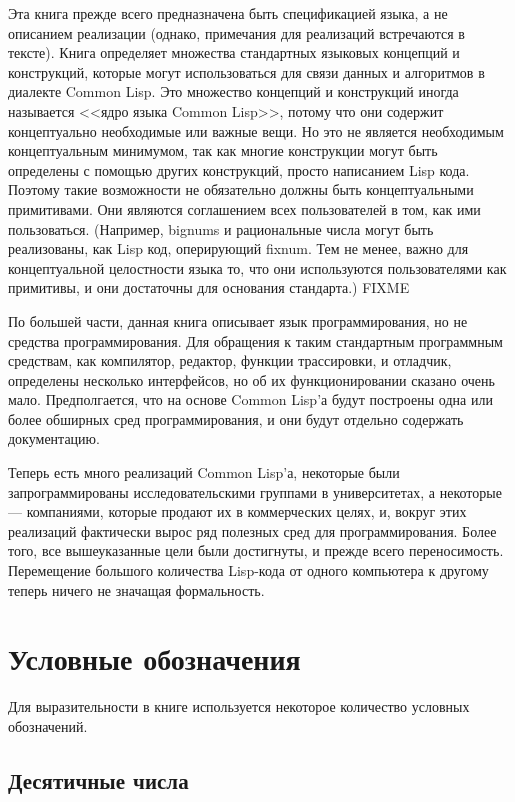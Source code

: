 Эта книга прежде всего предназначена быть спецификацией языка, а не
описанием реализации (однако, примечания для реализаций встречаются в тексте).
Книга определяет множества стандартных языковых концепций и конструкций, которые
могут использоваться для связи данных и алгоритмов в диалекте Common Lisp. Это
множество концепций и конструкций иногда называется <<ядро языка Common
Lisp>>, потому что они содержит концептуально необходимые или важные вещи. Но
это не является необходимым концептуальным минимумом, так как многие конструкции
могут быть определены с помощью других конструкций, просто написанием Lisp
кода. Поэтому такие возможности не обязательно должны быть 
концептуальными примитивами. Они являются соглашением всех пользователей в том,
как ими пользоваться. (Например, bignums и рациональные числа могут быть
реализованы, как Lisp код, оперирующий fixnum. Тем не менее, важно для
концептуальной целостности языка то, что они используются пользователями как
примитивы, и они достаточны для основания стандарта.) FIXME

По большей части, данная книга описывает язык программирования, но не средства
программирования. Для обращения к таким
стандартным программным средствам, как компилятор, редактор, функции
трассировки, и отладчик, определены несколько интерфейсов, но об их
функционировании сказано очень мало. Предполгается, что на основе Common Lisp'а
будут построены одна или более обширных сред программирования, и они будут отдельно
содержать документацию. 

Теперь есть много реализаций Common Lisp'а, некоторые были запрограммированы
исследовательскими группами в университетах, а некоторые --- компаниями, которые
продают их в коммерческих целях, и, вокруг
этих реализаций фактически вырос ряд полезных сред для программирования.
Более того, все вышеуказанные цели были достигнуты, и прежде всего
переносимость. Перемещение большого количества Lisp-кода от одного компьютера к
другому теперь ничего не значащая формальность.  

\section{Условные обозначения}

Для выразительности в книге используется некоторое количество условных обозначений.

\subsection{Десятичные числа}

